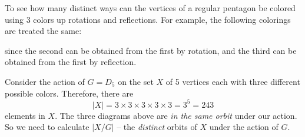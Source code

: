 \begin{example}
To see how many distinct ways can the vertices of a regular pentagon be colored using $3$ colors up rotations and reflections. For example, the following colorings are treated the same:

\newcommand{\drawcoloredpentagon}[7]{
    \begin{scope}[xshift=#1]
        \draw[thick, gray!40] (90:1) -- (162:1) -- (234:1) -- (306:1) -- (18:1) -- cycle;
        
        \filldraw[draw=black, thick, fill=#2] (90:1) circle (5pt);  %
        \filldraw[draw=black, thick, fill=#3] (162:1) circle (5pt); %
        \filldraw[draw=black, thick, fill=#4] (234:1) circle (5pt); %
        \filldraw[draw=black, thick, fill=#5] (306:1) circle (5pt); %
        \filldraw[draw=black, thick, fill=#6] (18:1) circle (5pt);  %
        
        \node at (0, -1.5) {\textbf{#7}};
    \end{scope}
}

\begin{center}
\end{center}
since the second can be obtained from the first by rotation, and the third can be obtained from the first by reflection. 

Consider the action of $G = D_5$ on the set $X$ of 5 vertices each with three different possible colors. Therefore, there are
$$|X| = 3 \times 3 \times 3 \times 3 \times 3 = 3^5 = 243$$
elements in $X$. The three diagrams above are {\it in the same orbit} under our action. So we need to calculate $|X/G|$ -- the {\it distinct} orbits of $X$ under the action of $G$.


\end{example}
